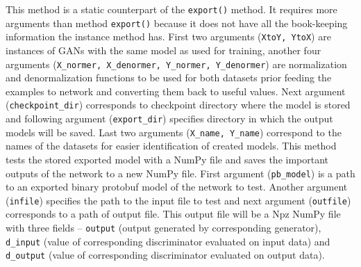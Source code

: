 \begin{itemize}
\begin{description}
 This method is a static counterpart of the \texttt{export()} method. It requires more arguments than method \texttt{export()} because it does not have all the book-keeping information the instance method has. First two arguments (\texttt{XtoY, YtoX}) are instances of GANs with the same model as used for training, another four arguments (\texttt{X\_normer, X\_denormer, Y\_normer, Y\_denormer}) are normalization and denormalization functions to be used for both datasets prior feeding the examples to network and converting them back to useful values. Next argument (\texttt{checkpoint\_dir}) corresponds to checkpoint directory where the model is stored and following argument (\texttt{export\_dir}) specifies directory in which the output models will be saved. Last two arguments (\texttt{X\_name, Y\_name}) correspond to the names of the datasets for easier identification of created models.
 This method tests the stored exported model with a NumPy file and saves the important outputs of the network to a new NumPy file. First argument (\texttt{pb\_model}) is a path to an exported binary protobuf model of the network to test. Another argument (\texttt{infile}) specifies the path to the input file to test and next argument (\texttt{outfile}) corresponds to a path of output file. This output file will be a Npz NumPy file with three fields -- \texttt{output} (output generated by corresponding generator), \texttt{d\_input} (value of corresponding discriminator evaluated on input data) and \texttt{d\_output} (value of corresponding discriminator evaluated on output data).


\end{description}
\end{itemize}
